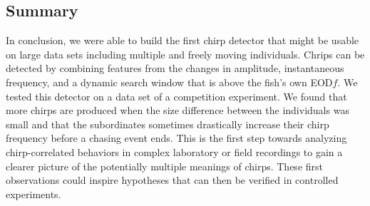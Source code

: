 \subsection{Summary}

In conclusion, we were able to build the first chirp detector that might be usable on large data sets including multiple and freely moving individuals. Chrips can be detected by combining features from the changes in amplitude, instantaneous frequency, and a dynamic search window that is above the fish's own EOD$f$. We tested this detector on a data set of a competition experiment. We found that more chirps are produced when the size difference between the individuals was small and that the subordinates sometimes drastically increase their chirp frequency before a chasing event ends. This is the first step towards analyzing chirp-correlated behaviors in complex laboratory or field recordings to gain a clearer picture of the potentially multiple meanings of chirps. These first observations could inspire hypotheses that can then be verified in controlled experiments. 